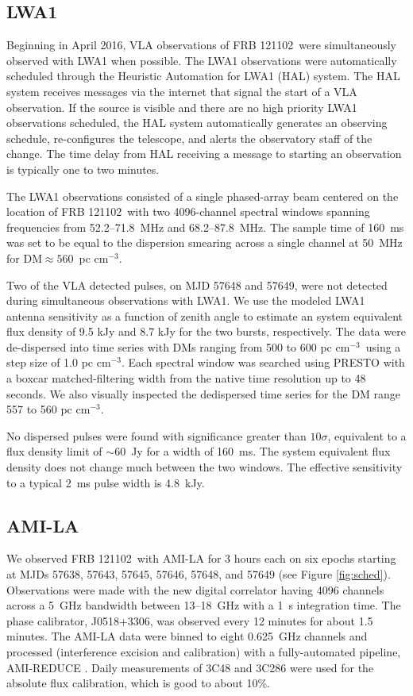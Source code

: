 \documentclass[twocolumn]{aastex61}
\newcommand{\frb}{FRB 121102}
\begin{document}
\subsection{LWA1}

Beginning in April 2016, VLA observations of \frb\ were simultaneously observed with LWA1 when possible.  The LWA1 observations were automatically scheduled through the Heuristic Automation for LWA1 (HAL) system.  The HAL system receives messages via the internet that signal the start of a VLA observation. If the source is visible and there are no high priority LWA1 observations scheduled, the HAL system automatically generates an observing schedule, re-configures the telescope, and alerts the observatory staff of the change. The time delay from HAL receiving a message to starting an observation is typically one to two minutes.

The LWA1 observations consisted of a single phased-array beam centered on the location of \frb\ with two 4096-channel spectral windows spanning frequencies from 52.2--71.8~MHz and 68.2--87.8~MHz. The sample time of 160~ms was set to be equal to the dispersion smearing across a single channel at 50~MHz for DM$\approx560$\ pc cm$^{-3}$. 

Two of the VLA detected pulses, on MJD 57648 and 57649, were not detected during simultaneous observations with LWA1. We use the modeled LWA1 antenna sensitivity as a function of zenith angle to estimate an system equivalent flux density of 9.5 kJy and 8.7 kJy for the two bursts, respectively. The data were de-dispersed into time series with DMs ranging from 500 to 600 pc cm$^{-3}$\ using a step size of 1.0 pc cm$^{-3}$. Each spectral window was searched using PRESTO \citep{2001PhDT.......123R} with a boxcar matched-filtering width from the native time resolution up to 48 seconds. We also visually inspected the dedispersed time series for the DM range 557 to 560 pc cm$^{-3}$.

No dispersed pulses were found with significance greater than $10\sigma$, equivalent to a flux density limit of $\sim60$\ Jy for a width of 160~ms. The system equivalent flux density does not change much between the two windows. The effective sensitivity to a typical 2~ms pulse width is 4.8~kJy.

\subsection{AMI-LA}

We observed \frb\ with AMI-LA for 3 hours each on six epochs starting at MJDs 57638, 57643, 57645, 57646, 57648, and 57649 (see Figure \ref{fig:sched}). Observations were made with the new digital correlator having 4096 channels across a 5~GHz bandwidth between 13--18~GHz with a 1~s integration time. The phase calibrator, J0518+3306, was observed every 12 minutes for about 1.5 minutes. The AMI-LA data were binned to eight 0.625~GHz channels and processed (interference excision and calibration) with a fully-automated pipeline, AMI-REDUCE \citep[e.g.,][]{2013MNRAS.429.3330P}. Daily measurements of 3C48 and 3C286 were used for the absolute flux calibration, which is good to about 10\%. 
\end{document}
